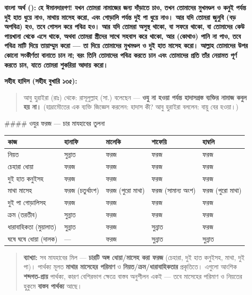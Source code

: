 \textbf{বাংলা অর্থ ():}
\textbf{হে ঈমানদারগণ! যখন তোমরা নামাজের জন্য দাঁড়াতে চাও, তখন তোমাদের মুখমণ্ডল ও কনুই পর্যন্ত দুই হাত ধুয়ে নাও, মাথায় মাসেহ করো, এবং গোড়ালি পর্যন্ত দুই পা ধুয়ে নাও। আর যদি তোমরা জুনুবি (বড় অপবিত্র) হও, তবে গোসল করে পবিত্র হও। আর যদি তোমরা অসুস্থ থাকো, বা সফরে থাকো, বা তোমাদের কেউ পায়খানা থেকে এসে থাকে, অথবা তোমরা স্ত্রীদের সাথে সহবাস করে থাকো, আর (কোথাও) পানি না পাও, তবে পবিত্র মাটি দিয়ে তায়াম্মুম করো — তা দিয়ে তোমাদের মুখমণ্ডল ও দুই হাত মাসেহ করো। আল্লাহ তোমাদের উপর কোনো সংকীর্ণতা বানাতে চান না; বরং তিনি তোমাদের পবিত্র করতে চান এবং তোমাদের প্রতি তাঁর নেয়ামত পূর্ণ করতে চান, যাতে তোমরা শুকরিয়া আদায় করো।}

\textbf{সহীহ হাদিস (সহীহ বুখারি ১৩৫):}

\begin{quote}
আবু হুরাইরা (রাঃ) থেকে: রাসূলুল্লাহ (সা.) বলেছেন — \textbf{ওযু না হওয়া পর্যন্ত হাদাসগ্রস্ত ব্যক্তির নামাজ কবুল হয় না।} (হাদ্রামৌতের এক ব্যক্তি জিজ্ঞেস করলেন: হাদাস কী? আবু হুরাইরা বললেন: বায়ু বের হওয়া।)
\end{quote}

\#\#\#\# ওযুর ফরজ — চার মাযহাবের তুলনা

\begin{table}[h]\centering\small
\begin{tabular}{lllll}
কাজ & হানাফি & মালেকি & শাফেয়ি & হাম্বলি \\
\hline
নিয়ত & সুন্নাত & ফরজ & ফরজ & ফরজ \\
চেহারা ধোয়া & ফরজ & ফরজ & ফরজ & ফরজ \\
দুই হাত কনুইসহ & ফরজ & ফরজ & ফরজ & ফরজ \\
মাথা মাসেহ & ফরজ (চতুর্থাংশ) & ফরজ (পুরো মাথা) & ফরজ (সামান্য অংশ) & ফরজ (পুরো মাথা) \\
দুই পা গোড়ালিসহ & ফরজ & ফরজ & ফরজ & ফরজ \\
ক্রম (তরতীব) & সুন্নাত & ফরজ & ফরজ & ফরজ \\
ধারাবাহিকতা (মুয়ালাত) & সুন্নাত & ফরজ & সুন্নাত & ফরজ \\
ঘষে ঘষে ধোয়া (দালক) & — & ফরজ & সুন্নাত & সুন্নাত \\
\hline
\end{tabular}
\end{table}

\begin{quote}
\textbf{ব্যাখ্যা:} সব মাযহাবের মিল — \textbf{চারটি অঙ্গ ধোয়া/মাসেহ করা ফরজ} (চেহারা, দুই হাত কনুইসহ, মাথা, দুই পা)। পার্থক্য মূলত \textbf{মাথার মাসেহের পরিমাণ} ও \textbf{নিয়ত/ক্রম/ধারাবাহিকতার} প্রকৃতিতে। এগুলো আংশিক \textbf{শব্দগত-প্রায়} পার্থক্য, কারণ বেশিরভাগ ক্ষেত্রে বাস্তব অনুশীলন একই — তবে মাসেহের পরিমাণ ও নিয়তের হুকুমে \textbf{বাস্তব পার্থক্য} আছে।
\end{quote}

